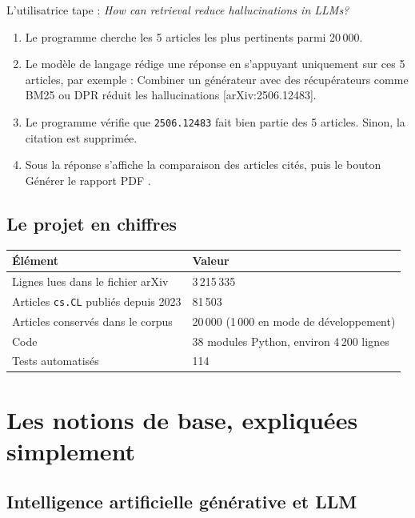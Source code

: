 \documentclass[11pt,a4paper]{article}
\newcommand{\code}[1]{\texttt{#1}}
\begin{document}
\begin{exemple}
L'utilisatrice tape : \emph{How can retrieval reduce hallucinations in LLMs?}

\begin{enumerate}[nosep]
  \item Le programme cherche les 5 articles les plus pertinents parmi 20\,000.
  \item Le modèle de langage rédige une réponse en s'appuyant uniquement sur ces 5 articles,
  par exemple : \og Combiner un générateur avec des récupérateurs comme BM25 ou DPR réduit
  les hallucinations [arXiv:2506.12483]. \fg{}
  \item Le programme vérifie que \code{2506.12483} fait bien partie des 5 articles. Sinon,
  la citation est supprimée.
  \item Sous la réponse s'affiche la comparaison des articles cités, puis le bouton
  \og Générer le rapport PDF \fg{}.
\end{enumerate}
\end{exemple}

\subsection{Le projet en chiffres}

\begin{center}
\begin{tabular}{ll}
\toprule
Élément & Valeur \\
\midrule
Lignes lues dans le fichier arXiv & 3\,215\,335 \\
Articles \code{cs.CL} publiés depuis 2023 & 81\,503 \\
Articles conservés dans le corpus & 20\,000 (1\,000 en mode de développement) \\
Code & 38 modules Python, environ 4\,200 lignes \\
Tests automatisés & 114 \\
\bottomrule
\end{tabular}
\end{center}

\section{Les notions de base, expliquées simplement}

\subsection{Intelligence artificielle générative et LLM}
\end{document}

